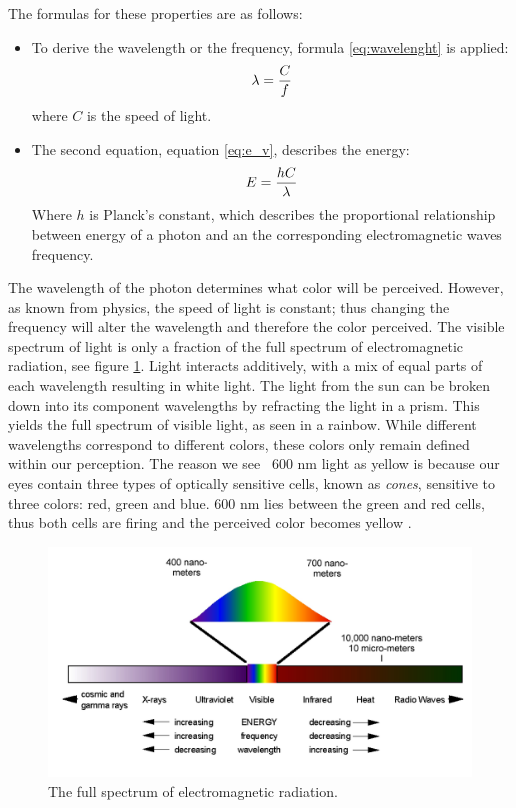 The formulas for these properties are as follows:
\begin{itemize}
\item To derive the wavelength or the frequency, formula \ref{eq:wavelenght} is applied:
\begin{align}
\centering 
\lambda = \frac{C}{f}
\label{eq:wavelenght} 
\end{align}
where {$C$} is the speed of light.
\item The second equation, equation \ref{eq:e_v}, describes the energy:
\begin{align}
\centering
E = \frac{hC}{\lambda}
\label{eq:e_v} 
\end{align}
Where {$h$} is Planck's constant, which describes the proportional relationship between energy of a photon and an the corresponding electromagnetic waves frequency.
\end{itemize}

The wavelength of the photon determines what color will be perceived. However, as known from physics, the speed of light is constant; thus changing the frequency will alter the wavelength and therefore the color perceived. The visible spectrum of light is only a fraction of the full spectrum of electromagnetic radiation, see figure \ref{fig:em_rad}. Light interacts additively, with a mix of equal parts of each wavelength resulting in white light. The light from the sun can be broken down into its component wavelengths by refracting the light in a prism. This yields the full spectrum of visible light, as seen in a rainbow.
While different wavelengths correspond to different colors, these colors only remain defined within our perception. The reason we see ~600 nm light as yellow is because our eyes contain three types of optically sensitive cells, known as \textit{cones}, sensitive to three colors: red, green and blue. 600 nm lies between the green and red cells, thus both cells are firing and the perceived color becomes yellow \citep{perception_book}.

\begin{figure}[htbp] 
\centering 
\includegraphics[width=1\textwidth]{Pictures/Theory/em_rad.png} 
\caption{The full spectrum of electromagnetic radiation.} 
\label{fig:em_rad} 
\end{figure}

